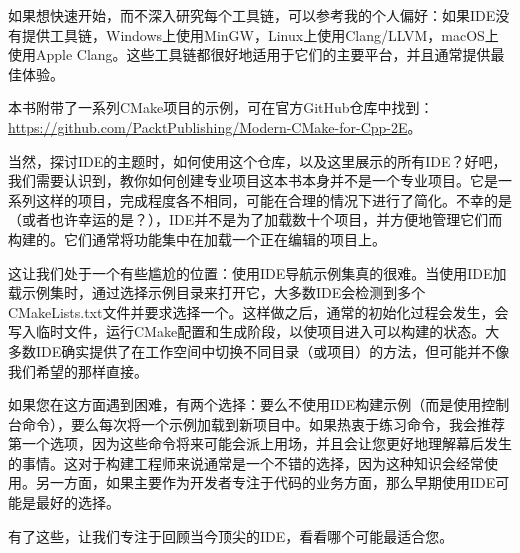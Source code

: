 如果想快速开始，而不深入研究每个工具链，可以参考我的个人偏好：如果IDE没有提供工具链，Windows上使用MinGW，Linux上使用Clang/LLVM，macOS上使用Apple Clang。这些工具链都很好地适用于它们的主要平台，并且通常提供最佳体验。


本书附带了一系列CMake项目的示例，可在官方GitHub仓库中找到：\url{https://github.com/PacktPublishing/Modern-CMake-for-Cpp-2E}。

当然，探讨IDE的主题时，如何使用这个仓库，以及这里展示的所有IDE？好吧，我们需要认识到，教你如何创建专业项目这本书本身并不是一个专业项目。它是一系列这样的项目，完成程度各不相同，可能在合理的情况下进行了简化。不幸的是（或者也许幸运的是？），IDE并不是为了加载数十个项目，并方便地管理它们而构建的。它们通常将功能集中在加载一个正在编辑的项目上。

这让我们处于一个有些尴尬的位置：使用IDE导航示例集真的很难。当使用IDE加载示例集时，通过选择示例目录来打开它，大多数IDE会检测到多个CMakeLists.txt文件并要求选择一个。这样做之后，通常的初始化过程会发生，会写入临时文件，运行CMake配置和生成阶段，以使项目进入可以构建的状态。大多数IDE确实提供了在工作空间中切换不同目录（或项目）的方法，但可能并不像我们希望的那样直接。

如果您在这方面遇到困难，有两个选择：要么不使用IDE构建示例（而是使用控制台命令），要么每次将一个示例加载到新项目中。如果热衷于练习命令，我会推荐第一个选项，因为这些命令将来可能会派上用场，并且会让您更好地理解幕后发生的事情。这对于构建工程师来说通常是一个不错的选择，因为这种知识会经常使用。另一方面，如果主要作为开发者专注于代码的业务方面，那么早期使用IDE可能是最好的选择。

有了这些，让我们专注于回顾当今顶尖的IDE，看看哪个可能最适合您。









